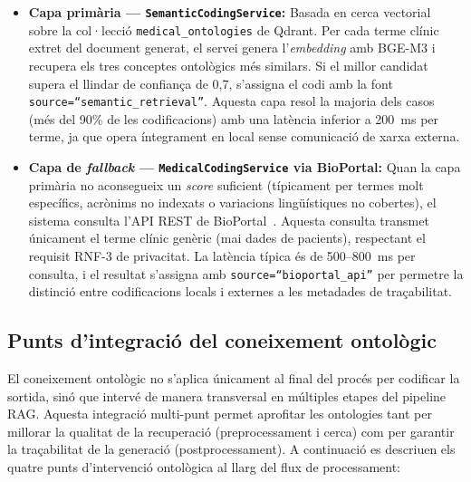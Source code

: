 \documentclass[CAT]{TFUOC}%
\begin{document}
\begin{itemize}
    \item \textbf{Capa primària --- \texttt{SemanticCodingService}:} Basada en cerca vectorial sobre la col·lecció \texttt{medical\_ontologies} de Qdrant. Per cada terme clínic extret del document generat, el servei genera l'\textit{embedding} amb BGE-M3 i recupera els tres conceptes ontològics més similars. Si el millor candidat supera el llindar de confiança de 0,7, s'assigna el codi amb la font \texttt{source=``semantic\_retrieval''}. Aquesta capa resol la majoria dels casos (més del 90\% de les codificacions) amb una latència inferior a 200~ms per terme, ja que opera íntegrament en local sense comunicació de xarxa externa.

    \item \textbf{Capa de \textit{fallback} --- \texttt{MedicalCodingService} via BioPortal:} Quan la capa primària no aconsegueix un \textit{score} suficient (típicament per termes molt específics, acrònims no indexats o variacions lingüístiques no cobertes), el sistema consulta l'API REST de BioPortal~\cite{vendetti2025bioportal}. Aquesta consulta transmet únicament el terme clínic genèric (mai dades de pacients), respectant el requisit RNF-3 de privacitat. La latència típica és de 500--800~ms per consulta, i el resultat s'assigna amb \texttt{source=``bioportal\_api''} per permetre la distinció entre codificacions locals i externes a les metadades de traçabilitat.
\end{itemize}

\subsection{Punts d'integració del coneixement ontològic}

El coneixement ontològic no s'aplica únicament al final del procés per codificar la sortida, sinó que intervé de manera transversal en múltiples etapes del pipeline RAG. Aquesta integració multi-punt permet aprofitar les ontologies tant per millorar la qualitat de la recuperació (preprocessament i cerca) com per garantir la traçabilitat de la generació (postprocessament). A continuació es descriuen els quatre punts d'intervenció ontològica al llarg del flux de processament:
\end{document}
